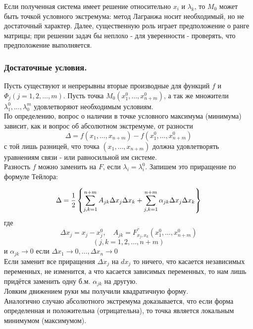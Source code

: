 Если полученная система имеет решение относительно $x_i$ и $\lambda_k$, то $M_0$ может быть точкой условного экстремума: метод Лагранжа носит необходимый, но не достаточный характер. Далее, существенную роль играет предположение о ранге матрицы; при решении задач бы неплохо - для уверенности - проверять, что предположение выполняется.
\subsubsection{Достаточные условия.}
Пусть существуют и непрерывны вторые производные для функций $f$ и $\Phi_j
(j = 1, 2,\dotsc, m)$. Пусть точка $M_0(x_1^0, \dotsc, x_{n+m}^0)$, а так же множители $\lambda_1^0,\dotsc,\lambda_0^m$ удовлетворяют необходимым условиям.\\

По определению, вопрос о наличии в точке условного максимума (минимума) зависит, как и вопрос об абсолютном экстремуме, от разности
$$\Delta = f(x_1,\dotsc, x_{n+m}) - f(x_1^0, \dotsc, x^0_{n+m})$$
с той лишь разницей, что точка $(x_1,\dotsc, x_{n+m})$ должна удовлетворять уравнениям связи - или равносильной им системе.\\

Разность $f$ можно заменить на $F$, если $\lambda_i = \lambda_i^0$. Запишем это приращение по формуле Тейлора:

$$\Delta = {1 \over 2}\left\{
	\sum_{j,k = 1}^{n+m}
	A_{jk}
	\Delta x_j
	\Delta x_k
	+
	\sum_{j,k = 1}^{n+m}
	\alpha_{jk}
	\Delta x_j
	\Delta x_k
	\right\}$$
	где
	$$\Delta x_j = x_j - x_j^0, \quad A_{jk} = F_{x_j, x_k}^{''}(x_1^0,
	\dotsc, x^0_{n+m})$$
	$$(j, k = 1, 2, \dotsc, n+m)$$
	и $\alpha_{jk} \to 0$ если $\Delta x_1 \to 0, \dotsc, \Delta x_n \to 0$\\

	Если заменит все приращения $\Delta x_j$ на $dx_j$ то ничего, что касается независимых переменных, не изменится, а что касается зависимых переменных,
	то нам лишь придётся заменить одну б.м. $\alpha_{jk}$ на другую.\\

	Ловким движением руки мы получили квадратичную форму.\\

	Аналогично случаю абсолютного экстремума доказывается, что если форма определенная и положительна (отрицательна), то точка является локальным минимумом (максимумом).
